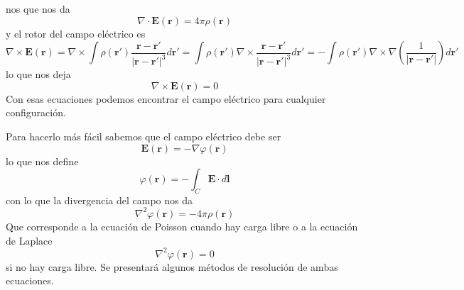 \documentclass[a4paper]{article}
\numberwithin{equation}{section} %
\renewcommand{\vec}[1]{\boldsymbol{#1}}
\begin{document}
nos que nos da
\begin{equation}
\nabla \cdot \vec{E}(\vec{r}) = 4\pi \rho(\vec{r})
\label{eq:gauss_diff}
\end{equation}
y el rotor del campo eléctrico es
\[\nabla \times \vec{E}(\vec{r}) = \nabla \times \int \rho(\vec{r}') \frac{\vec{r} - \vec{r}'}{|\vec{r} - \vec{r}'|^3} d\vec{r}' = \int \rho(\vec{r}') \nabla \times \frac{\vec{r} - \vec{r}'}{|\vec{r} - \vec{r}'|^3} d\vec{r}' = - \int \rho(\vec{r}') \nabla \times \nabla \left(\frac{1}{|\vec{r} - \vec{r}'|}\right) d\vec{r}'\]
lo que nos deja
\begin{equation}
\nabla \times \vec{E}(\vec{r}) = 0
\label{eq:electroestatica_rotor}
\end{equation}
Con esas ecuaciones podemos encontrar el campo eléctrico para cualquier configuración.

Para hacerlo más fácil sabemos que el campo eléctrico debe ser
\begin{equation}
 \vec{E}(\vec{r}) = - \nabla \varphi(\vec{r})
 \label{eq:electroestatico_potencial}
\end{equation}
lo que nos define
\begin{equation}
 \varphi(\vec{r}) = - \int_C \vec{E} \cdot d\vec{l}
 \label{eq:electroestatico_potencial_integral}
\end{equation}
con lo que la divergencia del campo nos da
\begin{equation}
 \nabla^2 \varphi(\vec{r}) = - 4  \pi \rho(\vec{r})
 \label{eq:electroestatico_potencial_poisson}
\end{equation}
Que corresponde a la ecuación de Poisson cuando hay carga libre o a la ecuación de Laplace
\begin{equation}
 \nabla^2 \varphi(\vec{r}) = 0
 \label{eq:electroestatico_potencial_laplace}
 \end{equation}
 si no hay carga libre. Se presentará algunos métodos de resolución de ambas ecuaciones.
\end{document}
